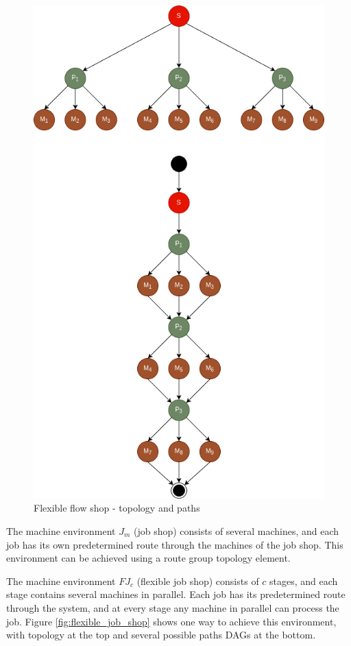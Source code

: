 \begin{figure}[!htbp]
	\centering
	\includegraphics[scale=0.6]{../images/flexible_flow_shop.png}
	\caption{Flexible flow shop - topology and paths}
    \label{fig:flexible_flow_shop}
\end{figure}

The machine environment $J_m$ (job shop) consists of several machines, and each job has its own predetermined route through the machines of the job shop. This environment can be achieved using a route group topology element.

The machine environment $FJ_c$ (flexible job shop) consists of $c$ stages, and each stage contains several machines in parallel. Each job has its predetermined route through the system, and at every stage any machine in parallel can process the job. Figure \ref{fig:flexible_job_shop} shows one way to achieve this environment, with topology at the top and several possible paths DAGs at the bottom.

